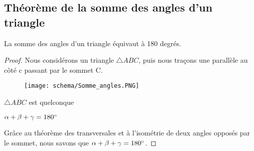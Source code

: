 \documentclass[a4paper,12pt]{article}
\begin{document}
\pagebreak
\subsection{Théorème de la somme des angles d'un triangle}
\begin{theorem}
La somme des angles d'un triangle équivaut à 180 degrés.
\end{theorem}
\begin{proof}

Nous considérons un triangle $\triangle ABC$, puis nous traçons une parallèle au côté c passant par le sommet C.
\begin{figure}[H]
    \centering
    \texttt{[image: schema/Somme\_angles.PNG]}
\end{figure}


\begin{hyp}
$\triangle ABC$ est quelconque
\end{hyp}
\begin{concl}
$\alpha + \beta +\gamma = 180 \degree$
\end{concl}
Grâce au théorème des transversales et à l'isométrie de deux angles opposés par le sommet, nous savons que $\alpha + \beta +\gamma = 180 \degree$.
\end{proof}
\end{document}
